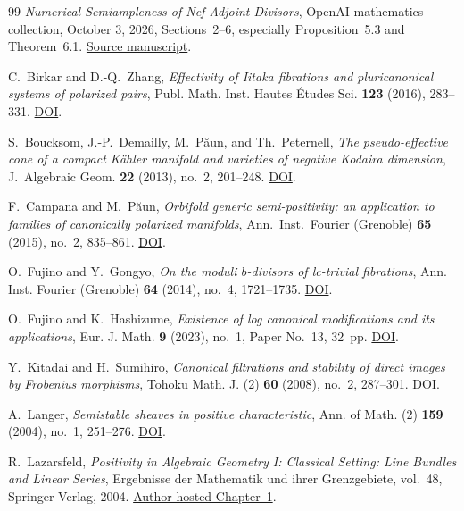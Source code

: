 \documentclass[12pt,a4paper,psamsfonts]{amsart}
\theoremstyle{definition}
\theoremstyle{plain}
\begin{document}
\begin{thebibliography}{99}
\emph{Numerical Semiampleness of Nef Adjoint Divisors},
OpenAI mathematics collection, October 3, 2026,
Sections~2--6, especially Proposition~5.3 and Theorem~6.1.
\href{https://github.com/openai/math/blob/main/preprints/Numerical-Semiampleness-of-Nef-Adjoint-Divisors-October-3-2026/paper.pdf}{Source manuscript}.

C.~Birkar and D.-Q.~Zhang,
\emph{Effectivity of Iitaka fibrations and pluricanonical systems of polarized pairs},
Publ. Math. Inst. Hautes \'Etudes Sci. \textbf{123} (2016), 283--331.
\href{https://doi.org/10.1007/s10240-016-0080-x}{DOI}.

S.~Boucksom, J.-P.~Demailly, M.~P\u{a}un, and Th.~Peternell,
\emph{The pseudo-effective cone of a compact K\"ahler manifold and varieties of negative Kodaira dimension},
J.~Algebraic Geom. \textbf{22} (2013), no.~2, 201--248.
\href{https://doi.org/10.1090/S1056-3911-2012-00574-8}{DOI}.

F.~Campana and M.~P\u{a}un,
\emph{Orbifold generic semi-positivity: an application to families of canonically polarized manifolds},
Ann.~Inst.~Fourier (Grenoble) \textbf{65} (2015), no.~2, 835--861.
\href{https://doi.org/10.5802/aif.2945}{DOI}.

O.~Fujino and Y.~Gongyo,
\emph{On the moduli $b$-divisors of lc-trivial fibrations},
Ann. Inst. Fourier (Grenoble) \textbf{64} (2014), no.~4, 1721--1735.
\href{https://doi.org/10.5802/aif.2894}{DOI}.

O.~Fujino and K.~Hashizume,
\emph{Existence of log canonical modifications and its applications},
Eur. J. Math. \textbf{9} (2023), no.~1, Paper No.~13, 32~pp.
\href{https://doi.org/10.1007/s40879-023-00598-0}{DOI}.

Y.~Kitadai and H.~Sumihiro,
\emph{Canonical filtrations and stability of direct images by Frobenius morphisms},
Tohoku Math. J. (2) \textbf{60} (2008), no.~2, 287--301.
\href{https://doi.org/10.2748/tmj/1215442876}{DOI}.

A.~Langer,
\emph{Semistable sheaves in positive characteristic},
Ann. of Math. (2) \textbf{159} (2004), no.~1, 251--276.
\href{https://doi.org/10.4007/annals.2004.159.251}{DOI}.

R.~Lazarsfeld,
\emph{Positivity in Algebraic Geometry I: Classical Setting: Line Bundles and Linear Series},
Ergebnisse der Mathematik und ihrer Grenzgebiete, vol.~48,
Springer-Verlag, 2004.
\href{https://www.math.stonybrook.edu/~roblaz/Reprints/Laz.PAG.Chapt1.pdf}{Author-hosted Chapter~1}.


\end{thebibliography}
\end{document}
